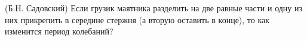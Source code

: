 (Б.Н. Садовский)
Если грузик маятника разделить на две равные части и одну из них
прикрепить в середине стержня (а вторую оставить в конце), то как
изменится период колебаний?
